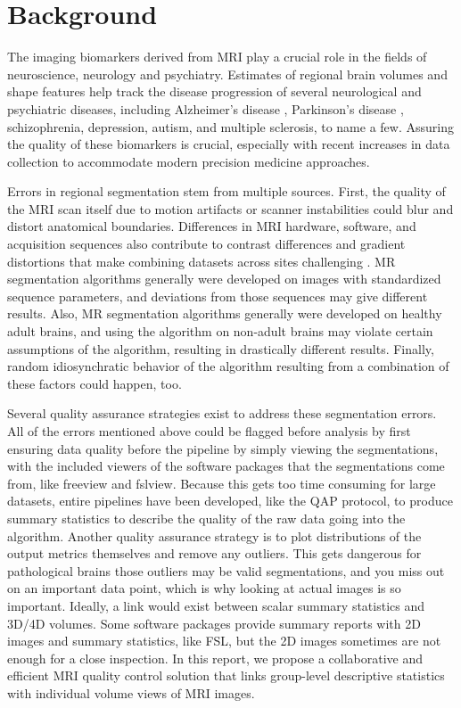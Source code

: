 \section{Background}


The imaging biomarkers derived from MRI play a crucial role in the fields of neuroscience, neurology and psychiatry. Estimates of regional brain volumes and shape features help track the disease progression of several neurological and psychiatric diseases, including Alzheimer's disease \cite{Vemuri_2010}, Parkinson's disease \cite{Silvia_Mangia_2013}, schizophrenia\cite{shenton2001review}, depression\cite{meisenzahl2011structural}, autism\cite{brambilla2003brain}, and multiple sclerosis\cite{Filippi_1995}, to name a few. Assuring the quality of these biomarkers is crucial, especially with recent increases in data collection to accommodate modern precision medicine approaches. 

Errors in regional segmentation stem from multiple sources. First, the quality of the MRI scan itself due to motion artifacts or scanner instabilities could blur and distort anatomical boundaries. Differences in MRI hardware, software, and acquisition sequences also contribute to contrast differences and gradient distortions that make combining datasets across sites challenging \cite{keshavan2016power}. MR segmentation algorithms generally were developed on images with standardized sequence parameters, and deviations from those sequences may give different results. Also, MR segmentation algorithms generally were developed on healthy adult brains, and using the algorithm on non-adult brains may violate certain assumptions of the algorithm, resulting in drastically different results. Finally, random idiosynchratic behavior of the algorithm resulting from a combination of these factors could happen, too.

Several quality assurance strategies exist to address these segmentation errors. All of the errors mentioned above could be flagged before analysis by first ensuring data quality before the pipeline by simply viewing the segmentations, with the included viewers of the software packages that the segmentations come from, like freeview and fslview. Because this gets too time consuming for large datasets, entire pipelines have been developed, like the QAP protocol, to produce summary statistics to describe the quality of the raw data going into the algorithm. Another quality assurance strategy is to plot distributions of the output metrics themselves and remove any outliers. This gets dangerous for pathological brains those outliers may be valid segmentations, and you miss out on an important data point, which is why looking at actual images is so important. Ideally, a link would exist between scalar summary statistics and 3D/4D volumes. Some software packages provide summary reports with 2D images and summary statistics, like FSL, but the 2D images sometimes are not enough for a close inspection. In this report, we propose a collaborative and efficient MRI quality control solution that links group-level descriptive statistics with individual volume views of MRI images.  

